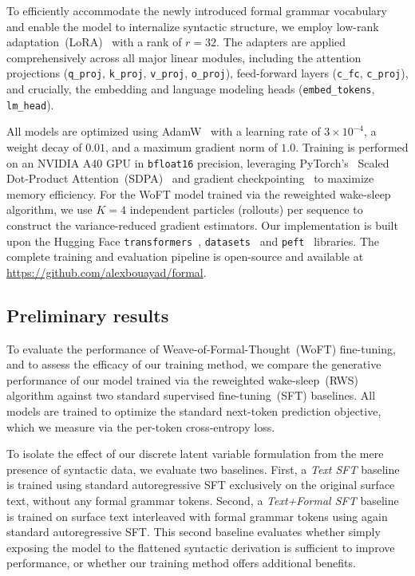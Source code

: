 \documentclass[11pt]{article}
\theoremstyle{plain}
\theoremstyle{definition}
\begin{document}
To efficiently accommodate the newly introduced formal grammar vocabulary and
enable the model to internalize syntactic structure, we employ low-rank
adaptation~(LoRA)~\cite{lora-2022} with a rank of \( r = 32 \). The adapters are
applied comprehensively across all major linear modules, including the attention
projections (\texttt{q\_proj}, \texttt{k\_proj}, \texttt{v\_proj},
\texttt{o\_proj}), feed-forward layers (\texttt{c\_fc}, \texttt{c\_proj}), and
crucially, the embedding and language modeling heads (\texttt{embed\_tokens},
\texttt{lm\_head}).

All models are optimized using AdamW~\cite{adamw-2019} with a learning rate of
\( 3 \times 10^{-4} \), a weight decay of \( 0.01 \), and a maximum gradient
norm of \( 1.0 \). Training is performed on an NVIDIA A40 GPU in
\texttt{bfloat16} precision, leveraging PyTorch's~\cite{pytorch-2019} Scaled
Dot-Product Attention~(SDPA)~\cite{sdpa-2022, sdpa-2-2024} and gradient
checkpointing~\cite{gradient-checkpointing-2016} to maximize memory efficiency.
For the WoFT model trained via the reweighted wake-sleep algorithm, we use \( K
= 4 \) independent particles (rollouts) per sequence to construct the
variance-reduced gradient estimators. Our implementation is built upon the
Hugging Face \texttt{transformers}~\cite{hf-transformers-2020},
\texttt{datasets}~\cite{hf-datasets-2021} and \texttt{peft}~\cite{hf-peft-2023}
libraries. The complete training and evaluation pipeline is open-source and
available at \url{https://github.com/alexbouayad/formal}.

\subsection{Preliminary results}

To evaluate the performance of Weave-of-Formal-Thought~(WoFT) fine-tuning, and
to assess the efficacy of our training method, we compare the generative
performance of our model trained via the reweighted wake-sleep~(RWS) algorithm
against two standard supervised fine-tuning~(SFT) baselines. All models are
trained to optimize the standard next-token prediction objective, which we
measure via the per-token cross-entropy loss.

To isolate the effect of our discrete latent variable formulation from the mere
presence of syntactic data, we evaluate two baselines. First, a \emph{Text SFT}
baseline is trained using standard autoregressive SFT exclusively on the
original surface text, without any formal grammar tokens. Second, a
\emph{Text+Formal SFT} baseline is trained on surface text interleaved with
formal grammar tokens using again standard autoregressive SFT. This second
baseline evaluates whether simply exposing the model to the flattened syntactic
derivation is sufficient to improve performance, or whether our training method
offers additional benefits.
\end{document}
